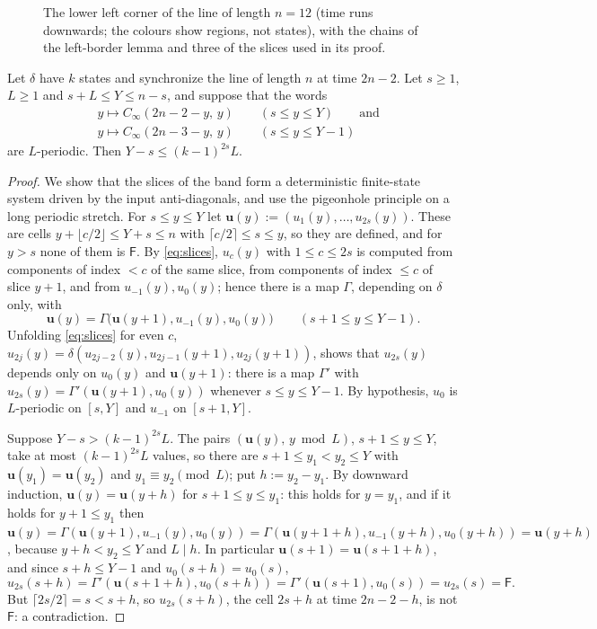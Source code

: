 \begin{figure}[t]
\centering

\caption{The lower left corner of the line of length $n=12$ (time runs
downwards; the colours show regions, not states), with the chains of the
left-border lemma and three of the slices used in its proof.}
\label{fig:chains}
\end{figure}

\begin{lemma}\label{lem:left}
Let $\delta$ have $k$ states and synchronize the line of length $n$ at time
$2n-2$. Let $s\ge1$, $L\ge1$ and $s+L\le Y\le n-s$, and suppose that the
words
\begin{align*}
&y\mapsto C_\infty(2n-2-y,\,y)\qquad(s\le y\le Y)\qquad\text{and}\\
&y\mapsto C_\infty(2n-3-y,\,y)\qquad(s\le y\le Y-1)
\end{align*}
are $L$-periodic. Then $Y-s\le (k-1)^{2s}L$.
\end{lemma}

\begin{proof}
We show that the slices of the band form a deterministic finite-state
system driven by the input anti-diagonals, and use the pigeonhole principle
on a long periodic stretch. For $s\le y\le Y$ let $\mathbf u(y):=(u_1(y),\dots,u_{2s}(y))$. These are cells
$y+\lfloor c/2\rfloor\le Y+s\le n$ with $\lceil c/2\rceil\le s\le y$, so
they are defined, and for $y>s$ none of them is $\mathsf F$. By
\eqref{eq:slices}, $u_c(y)$ with $1\le c\le 2s$ is computed from components
of index $<c$ of the same slice, from components of index $\le c$ of slice
$y+1$, and from $u_{-1}(y),u_0(y)$; hence there is a map $\Gamma$,
depending on $\delta$ only, with
\[
\mathbf u(y)=\Gamma\bigl(\mathbf u(y+1),u_{-1}(y),u_0(y)\bigr)\qquad(s+1\le y\le Y-1).
\]
Unfolding \eqref{eq:slices} for even $c$,
$u_{2j}(y)=\delta(u_{2j-2}(y),u_{2j-1}(y+1),u_{2j}(y+1))$, shows that
$u_{2s}(y)$ depends only on $u_0(y)$ and $\mathbf u(y+1)$: there is a map $\Gamma'$ with
$u_{2s}(y)=\Gamma'(\mathbf u(y+1),u_0(y))$ whenever $s\le y\le Y-1$. By hypothesis,
$u_0$ is $L$-periodic on $[s,Y]$ and $u_{-1}$ on $[s+1,Y]$.

Suppose $Y-s>(k-1)^{2s}L$. The pairs $(\mathbf u(y),\,y\bmod L)$, $s+1\le y\le Y$,
take at most $(k-1)^{2s}L$ values, so there are $s+1\le y_1<y_2\le Y$ with
$\mathbf u(y_1)=\mathbf u(y_2)$ and $y_1\equiv y_2\pmod L$; put $h:=y_2-y_1$. By downward induction,
$\mathbf u(y)=\mathbf u(y+h)$ for $s+1\le y\le y_1$: this holds for $y=y_1$, and if it holds for
$y+1\le y_1$ then
$\mathbf u(y)=\Gamma(\mathbf u(y+1),u_{-1}(y),u_0(y))=\Gamma(\mathbf u(y+1+h),u_{-1}(y+h),u_0(y+h))=\mathbf u(y+h)$,
because $y+h<y_2\le Y$ and $L\mid h$. In particular $\mathbf u(s+1)=\mathbf u(s+1+h)$, and
since $s+h\le Y-1$ and $u_0(s+h)=u_0(s)$,
\[
u_{2s}(s+h)=\Gamma'(\mathbf u(s+1+h),u_0(s+h))=\Gamma'(\mathbf u(s+1),u_0(s))=u_{2s}(s)=\mathsf F .
\]
But $\lceil 2s/2\rceil=s<s+h$, so $u_{2s}(s+h)$, the cell $2s+h$ at time
$2n-2-h$, is not $\mathsf F$: a contradiction.
\end{proof}

